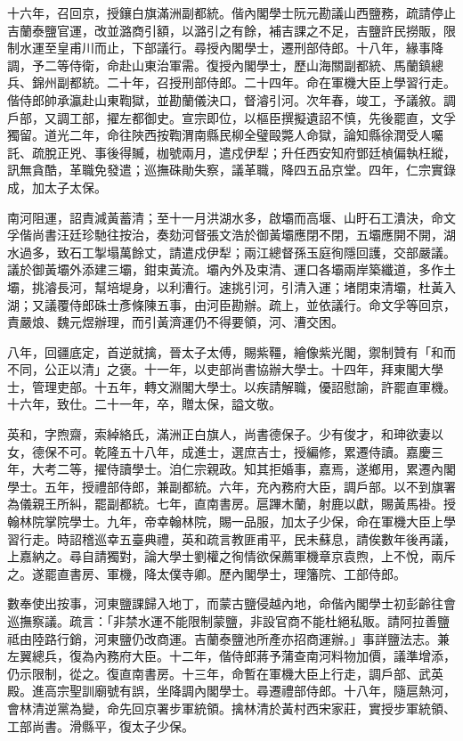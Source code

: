 \begin{pinyinscope}
十六年，召回京，授鑲白旗滿洲副都統。偕內閣學士阮元勘議山西鹽務，疏請停止吉蘭泰鹽官運，改並潞商引額，以潞引之有餘，補吉課之不足，吉鹽許民撈販，限制水運至皇甫川而止，下部議行。尋授內閣學士，遷刑部侍郎。十八年，緣事降調，予二等侍衛，命赴山東治軍需。復授內閣學士，歷山海關副都統、馬蘭鎮總兵、錦州副都統。二十年，召授刑部侍郎。二十四年。命在軍機大臣上學習行走。偕侍郎帥承瀛赴山東鞫獄，並勘蘭儀決口，督濬引河。次年春，竣工，予議敘。調戶部，又調工部，擢左都御史。宣宗即位，以樞臣撰擬遺詔不慎，先後罷直，文孚獨留。道光二年，命往陜西按鞫渭南縣民柳全璧毆斃人命獄，論知縣徐潤受人囑託、疏脫正兇、事後得贓，枷號兩月，遣戍伊犁；升任西安知府鄧廷楨偏執枉縱，訊無貪酷，革職免發遣；巡撫硃勛失察，議革職，降四五品京堂。四年，仁宗實錄成，加太子太保。

南河阻運，詔責減黃蓄清；至十一月洪湖水多，啟壩而高堰、山盱石工潰決，命文孚偕尚書汪廷珍馳往按治，奏劾河督張文浩於御黃壩應閉不閉，五壩應開不開，湖水過多，致石工掣塌萬餘丈，請遣戍伊犁；兩江總督孫玉庭徇隱回護，交部嚴議。議於御黃壩外添建三壩，鉗束黃流。壩內外及束清、運口各壩兩岸築纖道，多作土壩，挑濬長河，幫培堤身，以利漕行。速挑引河，引清入運；堵閉束清壩，杜黃入湖；又議覆侍郎硃士彥條陳五事，由河臣勘辦。疏上，並依議行。命文孚等回京，責嚴烺、魏元煜辦理，而引黃濟運仍不得要領，河、漕交困。

八年，回疆底定，首逆就擒，晉太子太傅，賜紫韁，繪像紫光閣，禦制贊有「和而不同，公正以清」之褒。十一年，以吏部尚書協辦大學士。十四年，拜東閣大學士，管理吏部。十五年，轉文淵閣大學士。以疾請解職，優詔慰諭，許罷直軍機。十六年，致仕。二十一年，卒，贈太保，謚文敬。

英和，字煦齋，索綽絡氏，滿洲正白旗人，尚書德保子。少有俊才，和珅欲妻以女，德保不可。乾隆五十八年，成進士，選庶吉士，授編修，累遷侍讀。嘉慶三年，大考二等，擢侍讀學士。洎仁宗親政。知其拒婚事，嘉焉，遂鄉用，累遷內閣學士。五年，授禮部侍郎，兼副都統。六年，充內務府大臣，調戶部。以不到旗署為儀親王所糾，罷副都統。七年，直南書房。扈蹕木蘭，射鹿以獻，賜黃馬褂。授翰林院掌院學士。九年，帝幸翰林院，賜一品服，加太子少保，命在軍機大臣上學習行走。時詔稽巡幸五臺典禮，英和疏言教匪甫平，民未蘇息，請俟數年後再議，上嘉納之。尋自請獨對，論大學士劉權之徇情欲保薦軍機章京袁煦，上不悅，兩斥之。遂罷直書房、軍機，降太僕寺卿。歷內閣學士，理籓院、工部侍郎。

數奉使出按事，河東鹽課歸入地丁，而蒙古鹽侵越內地，命偕內閣學士初彭齡往會巡撫察議。疏言：「非禁水運不能限制蒙鹽，非設官商不能杜絕私販。請阿拉善鹽祗由陸路行銷，河東鹽仍改商運。吉蘭泰鹽池所產亦招商運辦。」事詳鹽法志。兼左翼總兵，復為內務府大臣。十二年，偕侍郎蔣予蒲查南河料物加價，議準增添，仍示限制，從之。復直南書房。十三年，命暫在軍機大臣上行走，調戶部、武英殿。進高宗聖訓廟號有誤，坐降調內閣學士。尋遷禮部侍郎。十八年，隨扈熱河，會林清逆黨為變，命先回京署步軍統領。擒林清於黃村西宋家莊，實授步軍統領、工部尚書。滑縣平，復太子少保。


\end{pinyinscope}
